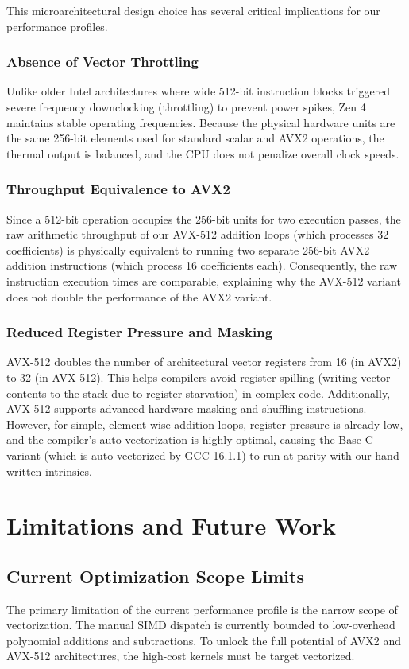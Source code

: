 This microarchitectural design choice has several critical implications for our performance profiles.

\subsubsection{Absence of Vector Throttling}
Unlike older Intel architectures where wide 512-bit instruction blocks triggered severe frequency downclocking (throttling) to prevent power spikes, Zen 4 maintains stable operating frequencies. Because the physical hardware units are the same 256-bit elements used for standard scalar and AVX2 operations, the thermal output is balanced, and the CPU does not penalize overall clock speeds.

\subsubsection{Throughput Equivalence to AVX2}
Since a 512-bit operation occupies the 256-bit units for two execution passes, the raw arithmetic throughput of our AVX-512 addition loops (which processes 32 coefficients) is physically equivalent to running two separate 256-bit AVX2 addition instructions (which process 16 coefficients each). Consequently, the raw instruction execution times are comparable, explaining why the AVX-512 variant does not double the performance of the AVX2 variant.

\subsubsection{Reduced Register Pressure and Masking}
AVX-512 doubles the number of architectural vector registers from 16 (in AVX2) to 32 (in AVX-512). This helps compilers avoid register spilling (writing vector contents to the stack due to register starvation) in complex code. Additionally, AVX-512 supports advanced hardware masking and shuffling instructions. However, for simple, element-wise addition loops, register pressure is already low, and the compiler's auto-vectorization is highly optimal, causing the Base C variant (which is auto-vectorized by GCC 16.1.1) to run at parity with our hand-written intrinsics.

\section{Limitations and Future Work}
\label{sec:bench_limitations}

\subsection{Current Optimization Scope Limits}
\label{sub:opt_limits}
The primary limitation of the current performance profile is the narrow scope of vectorization. The manual SIMD dispatch is currently bounded to low-overhead polynomial additions and subtractions. To unlock the full potential of AVX2 and AVX-512 architectures, the high-cost kernels must be target vectorized.


